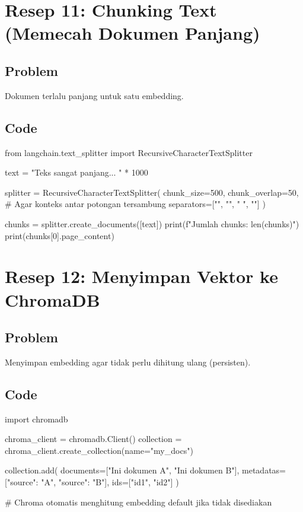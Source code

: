 \section{Resep 11: Chunking Text (Memecah Dokumen Panjang)}

\subsection*{Problem}
Dokumen terlalu panjang untuk satu embedding.

\subsection*{Code}
\begin{codeblock}[language=Python]
from langchain.text_splitter import RecursiveCharacterTextSplitter

text = "Teks sangat panjang... " * 1000

splitter = RecursiveCharacterTextSplitter(
    chunk_size=500,
    chunk_overlap=50, # Agar konteks antar potongan tersambung
    separators=["\n\n", "\n", " ", ""]
)

chunks = splitter.create_documents([text])
print(f"Jumlah chunks: {len(chunks)}")
print(chunks[0].page_content)
\end{codeblock}

\section{Resep 12: Menyimpan Vektor ke ChromaDB}

\subsection*{Problem}
Menyimpan embedding agar tidak perlu dihitung ulang (persisten).

\subsection*{Code}
\begin{codeblock}[language=Python]
import chromadb

chroma_client = chromadb.Client()
collection = chroma_client.create_collection(name="my_docs")

collection.add(
    documents=["Ini dokumen A", "Ini dokumen B"],
    metadatas=[{"source": "A"}, {"source": "B"}],
    ids=["id1", "id2"]
)

# Chroma otomatis menghitung embedding default jika tidak disediakan
\end{codeblock}

